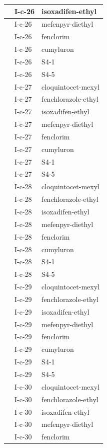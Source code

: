\documentclass[11pt,a4paper]{article}
\begin{document}
\begin{table}[h]
\begin{tabular}{|l|l|l|}
 & I-c-26 & isoxadifen-ethyl \\ \hline
 & I-c-26 & mefenpyr-diethyl \\ \hline
 & I-c-26 & fenclorim \\ \hline
 & I-c-26 & cumyluron \\ \hline
 & I-c-26 & S4-1 \\ \hline
 & I-c-26 & S4-5 \\ \hline
 & I-c-27 & cloquintocet-mexyl \\ \hline
 & I-c-27 & fenchlorazole-ethyl \\ \hline
 & I-c-27 & isoxadifen-ethyl \\ \hline
 & I-c-27 & mefenpyr-diethyl \\ \hline
 & I-c-27 & fenclorim \\ \hline
 & I-c-27 & cumyluron \\ \hline
 & I-c-27 & S4-1 \\ \hline
 & I-c-27 & S4-5 \\ \hline
 & I-c-28 & cloquintocet-mexyl \\ \hline
 & I-c-28 & fenchlorazole-ethyl \\ \hline
 & I-c-28 & isoxadifen-ethyl \\ \hline
 & I-c-28 & mefenpyr-diethyl \\ \hline
 & I-c-28 & fenclorim \\ \hline
 & I-c-28 & cumyluron \\ \hline
 & I-c-28 & S4-1 \\ \hline
 & I-c-28 & S4-5 \\ \hline
 & I-c-29 & cloquintocet-mexyl \\ \hline
 & I-c-29 & fenchlorazole-ethyl \\ \hline
 & I-c-29 & isoxadifen-ethyl \\ \hline
 & I-c-29 & mefenpyr-diethyl \\ \hline
 & I-c-29 & fenclorim \\ \hline
 & I-c-29 & cumyluron \\ \hline
 & I-c-29 & S4-1 \\ \hline
 & I-c-29 & S4-5 \\ \hline
 & I-c-30 & cloquintocet-mexyl \\ \hline
 & I-c-30 & fenchlorazole-ethyl \\ \hline
 & I-c-30 & isoxadifen-ethyl \\ \hline
 & I-c-30 & mefenpyr-diethyl \\ \hline
 & I-c-30 & fenclorim \\ \hline

\end{tabular}
\end{table}
\end{document}
